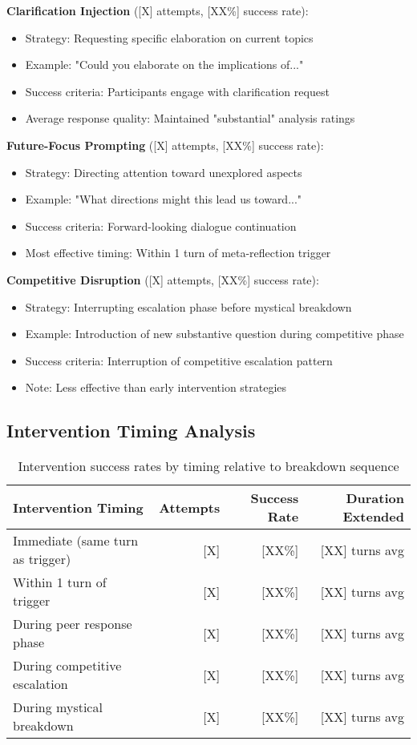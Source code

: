 \documentclass[11pt,letterpaper]{article}
\begin{document}
\textbf{Clarification Injection} ([X] attempts, [XX\%] success rate):
\begin{itemize}
    \item Strategy: Requesting specific elaboration on current topics
    \item Example: "Could you elaborate on the implications of..." 
    \item Success criteria: Participants engage with clarification request
    \item Average response quality: Maintained "substantial" analysis ratings
\end{itemize}

\textbf{Future-Focus Prompting} ([X] attempts, [XX\%] success rate):
\begin{itemize}
    \item Strategy: Directing attention toward unexplored aspects
    \item Example: "What directions might this lead us toward..."
    \item Success criteria: Forward-looking dialogue continuation
    \item Most effective timing: Within 1 turn of meta-reflection trigger
\end{itemize}

\textbf{Competitive Disruption} ([X] attempts, [XX\%] success rate):
\begin{itemize}
    \item Strategy: Interrupting escalation phase before mystical breakdown
    \item Example: Introduction of new substantive question during competitive phase
    \item Success criteria: Interruption of competitive escalation pattern
    \item Note: Less effective than early intervention strategies
\end{itemize}

\subsection{Intervention Timing Analysis}

\begin{table}[h]
\centering
\begin{tabular}{lrrr}
\toprule
\textbf{Intervention Timing} & \textbf{Attempts} & \textbf{Success Rate} & \textbf{Duration Extended} \\
\midrule
Immediate (same turn as trigger) & [X] & [XX\%] & [XX] turns avg \\
Within 1 turn of trigger & [X] & [XX\%] & [XX] turns avg \\
During peer response phase & [X] & [XX\%] & [XX] turns avg \\
During competitive escalation & [X] & [XX\%] & [XX] turns avg \\
During mystical breakdown & [X] & [XX\%] & [XX] turns avg \\
\bottomrule
\end{tabular}
\caption{Intervention success rates by timing relative to breakdown sequence}
\label{tab:intervention_timing}
\end{table}
\end{document}
